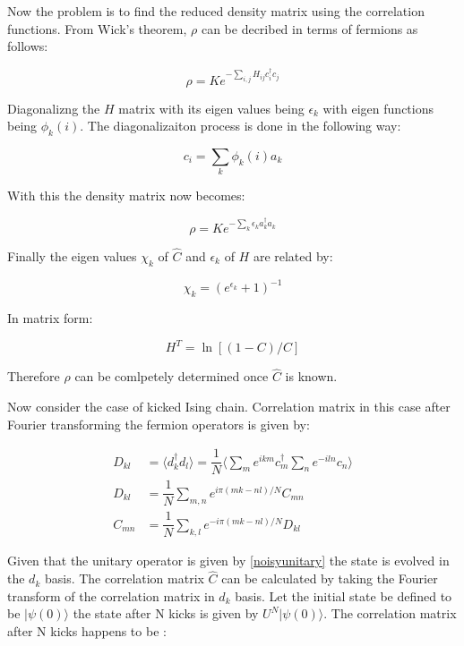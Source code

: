 \documentclass[11pt,a4paper]{article}
\begin{document}
Now the problem is to find the reduced density matrix using the correlation functions. From Wick's theorem, $\rho$ can be decribed in terms of fermions as follows:

\begin{equation}
\rho = K e^{-\sum_{i,j}H_{ij}c_{i}^\dagger c_{j}}
\end{equation}

Diagonalizng the $H$ matrix with its eigen values being $\epsilon_{k}$ with eigen functions being $ \phi_{k} (i)$. The diagonalizaiton process is done in the following way:

\begin{equation}
c_{i} = \sum_{k}\phi_{k}(i)a_{k}
\end{equation}

With this the density matrix now becomes:

\begin{equation}
\rho = K e^{-\sum_{k}\epsilon_{k}a_{k}^\dagger a_{k}}
\end{equation}

Finally the eigen values $\chi_{k}$ of $\hat{C}$ and $\epsilon_{k}$ of $H$ are related by:

\begin{equation}
\chi_{k}  =(e^{\epsilon_{k}} +1)^{-1}
\end{equation}

In matrix form:

\begin{equation}
H^T = \ln [(1-C)/C]
\end{equation}
		
		Therefore $\rho $ can be comlpetely determined once $\hat{C}$ is known. 
	
Now consider the case of kicked Ising chain. Correlation matrix in this case after Fourier transforming the fermion operators is given by: 
		
		\begin{align}
		D_{kl} &= \langle d_{k}^\dagger d_{l} \rangle =\dfrac{1}{N} \langle \sum_{m} e^{ikm} c_{m}^\dagger\sum_{n} e^{-iln}c_{n}\rangle \\
		D_{kl} &= \dfrac{1}{N}\sum_{m,n} e^{i\pi(mk-nl)/N}C_{mn}\\
		C_{mn}&=  \dfrac{1}{N}\sum_{k,l} e^{-i\pi(mk-nl)/N}D_{kl}
		\end{align}
		
		Given that the unitary operator is given by \ref{noisyunitary} the state is evolved in the $d_{k}$ basis. The correlation matrix $\hat{C}$ can be calculated by taking the Fourier transform of the correlation matrix in $d_{k}$ basis. 
Let the initial state be defined to be $|\psi(0)\rangle$ the state after N kicks is given by $U^N |\psi(0)\rangle$. The correlation matrix after N kicks happens to be :
\end{document}
